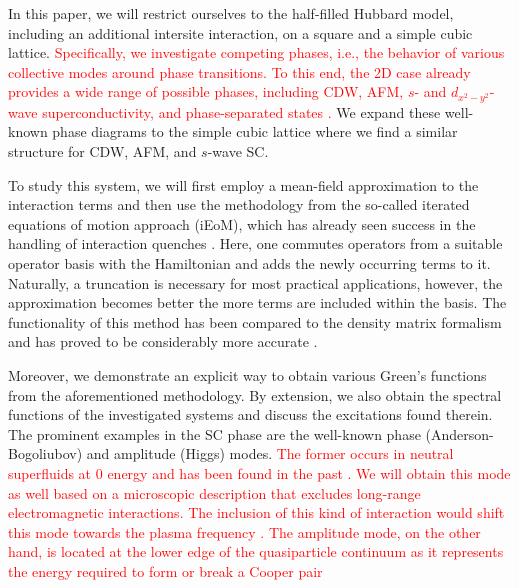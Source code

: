 \documentclass[
    reprint, 
    aps,
    preprintnumbers,
    twocolumn,
    prb,
    superscriptaddress
]{revtex4-2}
\begin{document}
In this paper, we will restrict ourselves to the half-filled Hubbard model, including an additional intersite interaction, on a square and a simple cubic lattice.
\textcolor{red}{Specifically, we investigate competing phases, i.e., the behavior of various collective modes around phase transitions.
To this end, the 2D case already provides a wide range of possible phases, including CDW, AFM, $s$- and $d_{x^2 - y^2}$-wave superconductivity, and phase-separated states \cite{Micnas88b,Tsuchiura95,Su01,Su04,ha11,Huang13,Jiang22,Linner23}.}
We expand these well-known phase diagrams to the simple cubic lattice where we find a similar structure for CDW, AFM, and $s$-wave SC.

To study this system, we will first employ a mean-field approximation to the interaction terms 
and then use the methodology from the so-called iterated equations of motion approach (iEoM),
which has already seen success in the handling of interaction quenches \cite{uhrig09,hamerla13,hamerla14,bleicker18}.
Here, one commutes operators from a suitable operator basis with the Hamiltonian and adds the newly occurring terms to it.
Naturally, a truncation is necessary for most practical applications, however, the approximation becomes better the more terms are included within the basis.
The functionality of this method has been compared to the density matrix formalism and has proved to be considerably more accurate \cite{Kalthoff17}.

Moreover, we demonstrate an explicit way to obtain various Green's functions from the aforementioned methodology.
By extension, we also obtain the spectral functions of the investigated systems and discuss the excitations found therein.
The prominent examples in the SC phase are the well-known phase (Anderson-Bogoliubov) and amplitude (Higgs) modes.
\textcolor{red}{The former occurs in neutral superfluids at $0$ energy and has been found in the past \cite{Bogoljubov1958,Anderson58,Brieskorn74,Schmid1975,simanek1975,schoen1976propagating,Maiti2015,Sun2020,Fan22}.
We will obtain this mode as well based on a microscopic description that excludes long-range electromagnetic interactions.
The inclusion of this kind of interaction would shift this mode towards the plasma frequency \cite{Anderson58,schoen1976propagating,Kulik1981}.}
\textcolor{red}{The amplitude mode, on the other hand, is located at the lower edge of the quasiparticle continuum as it represents the energy required to form or break a Cooper pair \cite{Schmid1975,Varma02,Cea14,Measson14,Tsuji15,Krull16,Mueller2019,Schwarz20}}
\end{document}
